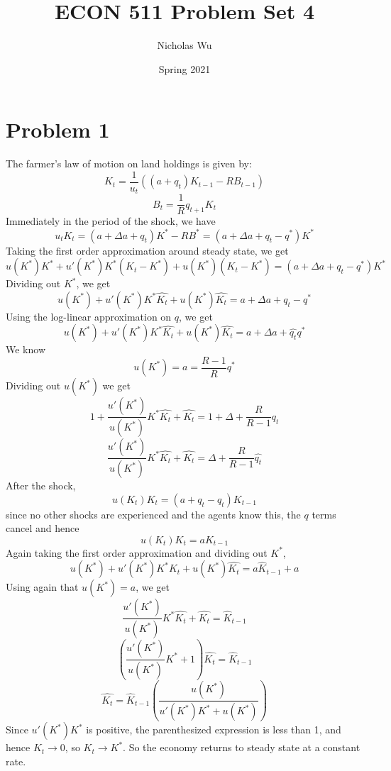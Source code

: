 \documentclass[10pt,letter]{article}
\newcommand{\problem}[1]{\section*{Problem #1}}
\begin{document}


\title{ECON 511 Problem Set 4}

\author{Nicholas Wu}

\date{Spring 2021}

\maketitle

\problem{1}
The farmer's law of motion on land holdings is given by:
\[ K_t = \frac{1}{u_t} ((a+q_t)K_{t-1} - RB_{t-1}) \]
\[ B_t = \frac{1}{R}q_{t+1}K_t \]
Immediately in the period of the shock, we have
\[ u_t K_t = (a + \Delta a + q_t)K^* - RB^* = (a + \Delta a + q_t - q^*)K^* \]
Taking the first order approximation around steady state, we get
\[ u(K^*)K^* + u'(K^*)K^*(K_t - K^*) + u(K^*)(K_t - K^*) = (a + \Delta a + q_t - q^*)K^* \]
Dividing out $K^*$, we get
\[ u(K^*) + u'(K^*)K^*\hat{K_t}  + u(K^*)\hat{K_t} = a + \Delta a + q_t - q^* \]
Using the log-linear approximation on $q$, we get
\[ u(K^*) + u'(K^*)K^*\hat{K_t}  + u(K^*)\hat{K_t} = a + \Delta a + \hat{q_t} q^* \]
We know
\[ u(K^*) = a = \frac{R-1}{R}q^* \]
Dividing out $u(K^*)$ we get
\[ 1 + \frac{u'(K^*)}{u(K^*)} K^*\hat{K_t} + \hat{K_t} = 1 + \Delta + \frac{R}{R-1}\hat{q_t} \]
\[ \frac{u'(K^*)}{u(K^*)} K^*\hat{K_t} + \hat{K_t} = \Delta + \frac{R}{R-1}\hat{q_t} \]
After the shock,
\[ u(K_t)K_t = (a + q_t - q_t)K_{t-1} \]
since no other shocks are experienced and the agents know this, the $q$ terms cancel and hence
\[ u(K_t)K_t = aK_{t-1} \]
Again taking the first order approximation and dividing out $K^*$,
\[ u(K^*) + u'(K^*)K^*\hat{K_t}  + u(K^*)\hat{K_t} = a\hat{K}_{t-1} + a \]
Using again that $u(K^*) = a$, we get
\[ \frac{u'(K^*)}{u(K^*)}K^*\hat{K_t}  + \hat{K_t} = \hat{K}_{t-1} \]
\[ \left(\frac{u'(K^*)}{u(K^*)}K^* + 1 \right)\hat{K_t} = \hat{K}_{t-1} \]
\[ \hat{K_t} = \hat{K}_{t-1}\left(\frac{u(K^*)}{u'(K^*)K^* + u(K^*)} \right) \]
Since $u'(K^*)K^*$ is positive, the parenthesized expression is less than 1, and hence $\hat{K_t} \to 0$, so $K_t \to K^*$.
So the economy returns to steady state at a constant rate.
\end{document}
